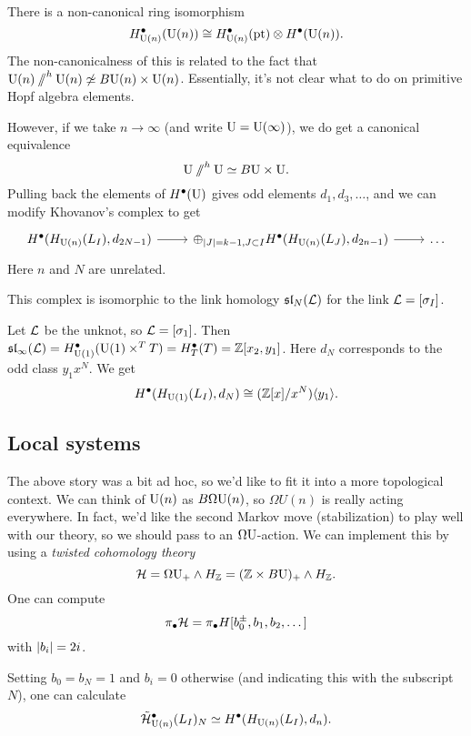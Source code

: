 There is a non-canonical ring isomorphism 
\[
	H^\bullet_{\mathrm{U}(n)}(\mathrm{U}(n)) \cong H^\bullet_{\mathrm{U}(n)}(\operatorname{pt}) \otimes H^\bullet(\mathrm{U}(n)).
\]
The non-canonicalness of this is related to the fact that $\mathrm{U}(n) \mathbin{/\mkern-6mu/}^h \mathrm{U}(n) \not\simeq B\mathrm{U}(n) \times \mathrm{U}(n)$.
Essentially, it's not clear what to do on primitive Hopf algebra elements.

However, if we take $n \to \infty$ (and write $\mathrm{U} = \mathrm{U}(\infty)$), we do get a canonical equivalence
\[
	\mathrm{U} \mathbin{/\mkern-6mu/}^h \mathrm{U} \simeq B\mathrm{U} \times \mathrm{U}.
\]
Pulling back the elements of $H^\bullet(\mathrm{U})$ gives odd elements $d_1, d_3, \dots$, and we can modify Khovanov's complex to get
\[
	\begin{tikzcd}
		H^\bullet(H_{\U(n)}(L_I), d_{2N-1}) \rar & \oplus_{\abs{J} = k-1, J \subset I} H^\bullet(H_{\U(n)}(L_J), d_{2n-1}) \rar & \dots 
	\end{tikzcd}
\]
Here $n$ and $N$ are unrelated.

\begin{thm}[T. Gomez]
	This complex is isomorphic to the link homology $\mathfrak{sl}_N(\mathcal{L})$ for the link $\mathcal{L} = [\sigma_I]$.
\end{thm}

\begin{ex}
	Let $\mathcal{L}$ be the unknot, so $\mathcal{L} = [\sigma_1]$.
	Then $\mathfrak{sl}_\infty(\mathcal{L}) = H^\bullet_{\mathrm{U}(1)}(\mathrm{U}(1) \times^T T) = H^\bullet_T(T) = \mathbb{Z}[x_2, y_1]$.
	Here $d_N$ corresponds to the odd class $y_1 x^N$.
	We get
	\[
		H^\bullet(H_{\mathrm{U}(1)}(L_I), d_N) \cong (\mathbb{Z}[x] / x^N) \langle y_1 \rangle.
	\]
\end{ex}

\subsection{Local systems}

The above story was a bit ad hoc, so we'd like to fit it into a more topological context.
We can think of $\mathrm{U}(n)$ as $B \Omega \mathrm{U}(n)$, so $\Omega U(n)$ is really acting everywhere.
In fact, we'd like the second Markov move (stabilization) to play well with our theory, so we should pass to an $\Omega \mathrm{U}$-action.
We can implement this by using a \emph{twisted cohomology theory}
\[
	\mathcal{H} = \Omega \mathrm{U}_+ \wedge H_{\mathbb{Z}} = (\mathbb{Z} \times B\mathrm{U})_+ \wedge H_{\mathbb{Z}}.
\]
One can compute
\[
	\pi_\bullet \mathcal{H} = \pi_\bullet H[b_0^\pm, b_1, b_2, \dots]
\]
with $\left|{b_i}\right| = 2i$.

Setting $b_0 = b_N = 1$ and $b_i = 0$ otherwise (and indicating this with the subscript $N$), one can calculate
\[
	\tilde{\mathcal{H}}_{\mathrm{U}(n)}^\bullet(L_I)_N \simeq H^\bullet(H_{\mathrm{U}(n)}(L_I), d_n).
\]

